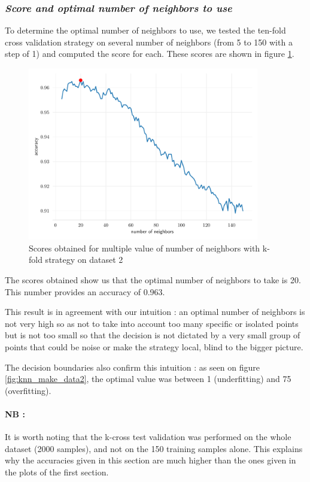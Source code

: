 \subsubsection{{\it Score and optimal number of neighbors to use}}
To determine the optimal number of neighbors to use, we tested the ten-fold cross validation strategy on several number of neighbors (from \num{5} to \num{150} with a step of 1) and computed the score for each. These scores are shown in figure \ref{fig:knn_score}.
\begin{figure}[H]
    \centering
    \includegraphics[width=0.9\textwidth]{resources/pdf/knn_kfold_scores.pdf}
    \caption{Scores obtained for multiple value of number of neighbors with k-fold strategy on dataset 2}
    \label{fig:knn_score}
\end{figure}
The scores obtained show us that the optimal number of neighbors to take is \num{20}. This number provides an accuracy of \num{0.963}.\par
This result is in agreement with our intuition : an optimal number of neighbors is not very high so as not to take into account too many specific or isolated points but is not too small so that the decision is not dictated by a very small group of points that could be noise or make the strategy local, blind to the bigger picture.\par
The decision boundaries also confirm this intuition : as seen on figure \ref{fig:knn_make_data2}, the optimal value was between \num{1} (underfitting) and \num{75} (overfitting).\par
\paragraph{NB :} It is worth noting that the k-cross test validation was performed on the whole dataset (2000 samples), and not on the 150 training samples alone. This explains why the accuracies given in this section are much higher than the ones given in the plots of the first section.


